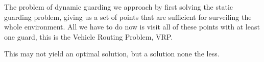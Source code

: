 The problem of dynamic guarding we approach by first solving the static guarding problem, giving us a set of points that are sufficient for surveiling the whole environment.
All we have to do now is visit all of these points with at least one guard, this is the Vehicle Routing Problem, VRP.

This may not yield an optimal solution, but a solution none the less.
